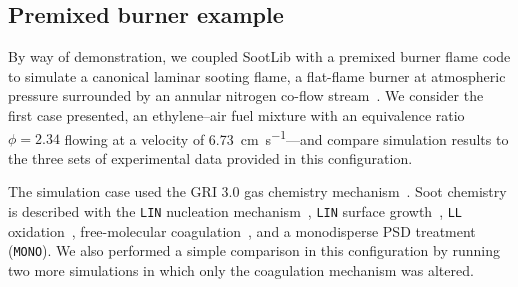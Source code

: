 \documentclass[preprint,letterpaper]{elsarticle}
\begin{document}
\subsection{Premixed burner example}
\label{s:soot-examples-premixed}

By way of demonstration, we coupled SootLib with a premixed burner flame code to simulate a canonical laminar sooting flame, a flat-flame burner at atmospheric pressure surrounded by an annular nitrogen co-flow stream~\cite{Xu_1997,Menon_2007}. We consider the first case presented, an ethylene--air fuel mixture with an equivalence ratio $\phi=2.34$ flowing at a velocity of \qty{6.73}{\cm\per\s}---and compare simulation results to the three sets of experimental data provided in this configuration.

The simulation case used the GRI 3.0 gas chemistry mechanism~\cite{Smith_2002}. Soot chemistry is described with the \texttt{LIN} nucleation mechanism~\cite{Lindstedt_2005}, \texttt{LIN} surface growth~\cite{Lindstedt_1994}, \texttt{LL} oxidation~\cite{Leung_1991}, free-molecular coagulation~\cite{Seinfeld_2016}, and a monodisperse PSD treatment (\texttt{MONO}). We also performed a simple comparison in this configuration by running two more simulations in which only the coagulation mechanism was altered.
\end{document}
